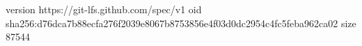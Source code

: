 version https://git-lfs.github.com/spec/v1
oid sha256:d76dca7b88ecfa276f2039e8067b8753856e4f03d0dc2954c4fc5feba962ca02
size 87544
